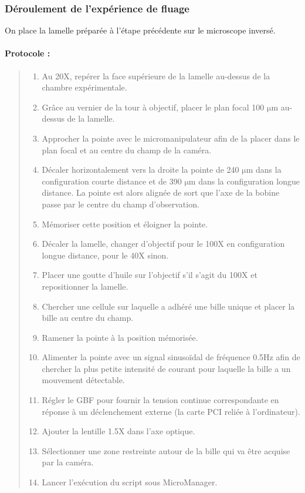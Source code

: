 \documentclass{report}
\newcommand{\micro}{$\mathrm{\mu}$}
\begin{document}
	\subsubsection{Déroulement de l'expérience de fluage}
	
	On place la lamelle préparée à l'étape précédente sur le microscope inversé. 
	\paragraph{Protocole : }
	\begin{quote}
	\begin{enumerate}
	\item Au 20X, repérer la face supérieure de la lamelle au-dessus de la chambre expérimentale.
	\item Grâce au vernier de la tour à objectif, placer le plan focal 100 \micro m au-dessus de la lamelle. 
	\item Approcher la pointe avec le micromanipulateur afin de la placer dans le plan focal et au centre du champ de la caméra. 
	\item Décaler horizontalement vers la droite la pointe de 240 \micro m dans la configuration courte distance et de 390 \micro m dans la configuration longue distance. La pointe est alors alignée de sort que l'axe de la bobine passe par le centre du champ d'observation. 
	\item Mémoriser cette position et éloigner la pointe.
	\item Décaler la lamelle, changer d'objectif pour le 100X en configuration longue distance, pour le 40X sinon.
	\item Placer une goutte d'huile sur l'objectif s'il s'agit du 100X et repositionner la lamelle. 
	\item Chercher une cellule sur laquelle a adhéré une bille unique et placer la bille au centre du champ.
	\item Ramener la pointe à la position mémorisée.
	\item Alimenter la pointe avec un signal sinusoïdal de fréquence 0.5Hz afin de chercher la plus petite intensité de courant pour laquelle la bille a un mouvement détectable. 
	\item Régler le GBF pour fournir la tension continue correspondante en réponse à un déclenchement externe (la carte PCI reliée à l'ordinateur). 
	\item Ajouter la lentille 1.5X dans l'axe optique.
	\item Sélectionner une zone restreinte autour de la bille qui va être acquise par la caméra.
	\item Lancer l'exécution du script sous MicroManager.
	\end{enumerate}
	\end{quote}
	
\end{document}
